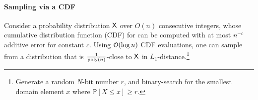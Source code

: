 \paragraph*{Sampling via a CDF}\label{para:CDF}
Consider a probability distribution $\mathsf{X}$ over $O(n)$ consecutive integers, whose cumulative distribution function (CDF) for can be computed with at most $n^{-c}$ additive error for constant $c$.
Using $\Bo(\log n)$ CDF evaluations, one can sample from a distribution that is
$\frac{1}{\mathrm{poly}(n)}$-close to $\mathsf{X}$ in $L_1$-distance.\footnote{Generate a random $N$-bit number $r$, and binary-search for the smallest domain element $x$ where $\mathbb P[X\leq x] \geq r$.}
